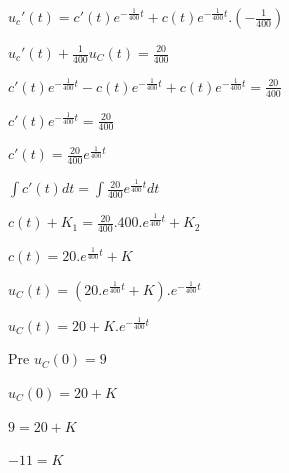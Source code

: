 \documentclass[10pt,a4paper]{article}
\begin{document}
	$u_{c}'(t) = c'(t)e^{-\frac{1}{400}t} + c(t)e^{-\frac{1}{400}t}.(-\frac{1}{400})$
	
	\vspace*{0.1cm}

	$u_{c}'(t) + \frac{1}{400} u_{C}(t) = \frac{20}{400}$

	\vspace*{0.1cm}
	
	$c'(t)e^{-\frac{1}{400}t} - c(t)e^{-\frac{1}{400}t} + c(t)e^{-\frac{1}{400}t} = \frac{20}{400}$

	\vspace*{0.1cm}
	
	$c'(t)e^{-\frac{1}{400}t} = \frac{20}{400}$
	
	\vspace*{0.1cm}
	
	$c'(t) = \frac{20}{400}e^{\frac{1}{400}t}$
	
	\vspace*{0.1cm}
	
	$\int c'(t)dt = \int \frac{20}{400}e^{\frac{1}{400}t}dt$

	\vspace*{0.1cm}
	
	$c(t)+K_{1} = \frac{20}{400}.400.e^{\frac{1}{400}t}+K_{2}$
	
	\vspace*{0.1cm}
	
	$c(t) = 20.e^{\frac{1}{400}t}+K$
	
	\vspace*{0.1cm}
	
	$u_{C}(t) = (20.e^{\frac{1}{400}t}+K).e^{-\frac{1}{400}t}$
	
	\vspace*{0.1cm}
	
	$u_{C}(t) = 20+K.e^{-\frac{1}{400}t}$
	
	\vspace*{0.3cm}
	
	Pre $u_{C}(0) = 9$
	
	\vspace*{0.1cm}
	
	$u_{C}(0) = 20 + K$
	
	\vspace*{0.1cm}
	
	$9 = 20 + K$
	
	\vspace*{0.1cm}
	
	$-11 = K$
	
	\vspace*{0.1cm}
	
\end{document}
